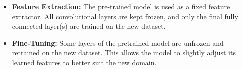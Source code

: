 \begin{itemize}
    \item \textbf{Feature Extraction:} The pre-trained model is used as a fixed feature extractor. All convolutional layers are kept frozen, and only the final fully connected layer(s) are trained on the new dataset.
    \item \textbf{Fine-Tuning:} Some layers of the pretrained model are unfrozen and retrained on the new dataset. This allows the model to slightly adjust its learned features to better suit the new domain.
\end{itemize}








